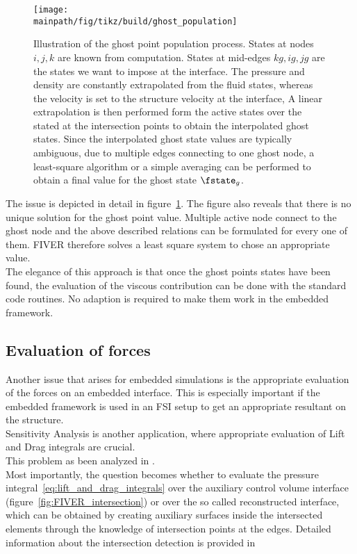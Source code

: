 \documentclass[../main.tex]{subfiles}
\begin{document}
\begin{figure}[h!]
	\begin{center}
        \texttt{[image: \\mainpath/fig/tikz/build/ghost\_population]}
        \caption[Ghost Point population]{Illustration of the ghost point population process. States at nodes $i,j,k$ are known from computation. States at mid-edges $kg,ig,jg$ are the states we want to impose at the interface. The pressure and density are constantly extrapolated from the fluid states, whereas the velocity is set to the structure  velocity at the interface, A linear extrapolation is then performed form the active states over the stated at the intersection points to obtain the interpolated ghost states. Since the interpolated ghost state values are typically ambiguous, due to multiple edges connecting to one ghost node, a least-square algorithm or a simple averaging can be performed to obtain a final value for the ghost state $\fstate_g$.}
		\label{fig:ghost_population}
    \end{center}
\end{figure}


The issue is depicted in detail in figure~\ref{fig:ghost_population}.
The figure also reveals that there is no unique solution for the ghost point value. Multiple active node connect to the ghost node and the above described relations can be formulated for every one of them. \ac{FIVER} therefore solves a least square system to chose an appropriate value.\\
The elegance of this approach is that once the ghost points states have been found, the evaluation of the viscous contribution can be done with the standard code routines. No adaption is required to make them work in the embedded framework.


\subsection{Evaluation of forces}\label{sec:fiver_force_evaluation}
Another issue that arises for embedded simulations is the appropriate evaluation of the forces on an embedded interface. This is especially important if the embedded framework is used in an \ac{FSI} setup to get an appropriate resultant on the structure.\\
Sensitivity Analysis is another application, where appropriate evaluation of Lift and Drag integrals are crucial.\\
This problem as been analyzed in \cite{Wang2011}\cite{Wang2012}.\\
Most importantly, the question becomes whether to evaluate the pressure integral~\eqref{eq:lift_and_drag_integrals} over the auxiliary control volume interface (figure~\ref{fig:FIVER_intersection}) or over the so called reconstructed interface, which can be obtained by creating auxiliary surfaces inside the intersected elements through the knowledge of intersection points at the edges. Detailed information about the intersection detection is provided in \cite{Wang2011a}
\end{document}
